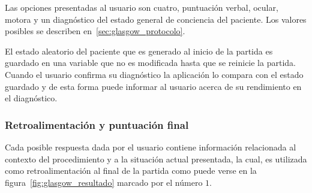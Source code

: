 Las opciones presentadas al usuario son cuatro, puntuación verbal, ocular,
motora y un diagnóstico del estado general de conciencia del paciente. Los valores posibles 
se describen en~\ref{sec:glasgow_protocolo}.

El estado aleatorio del paciente que es generado al inicio de la partida es
guardado en una variable que no es modificada hasta que se reinicie la partida. 
Cuando el usuario confirma su diagnóstico la
aplicación lo compara con el estado guardado y de esta forma puede informar al
usuario acerca de su rendimiento en el diagnóstico. 

%
%
%
%

\subsubsection{Retroalimentación y puntuación final}
%

Cada posible respuesta dada por el usuario contiene información
relacionada al contexto del procedimiento y a la situación actual presentada, la
cual, es utilizada como retroalimentación al final de la partida como puede
verse en la figura~\ref{fig:glasgow_resultado} marcado por el número $1$. 

